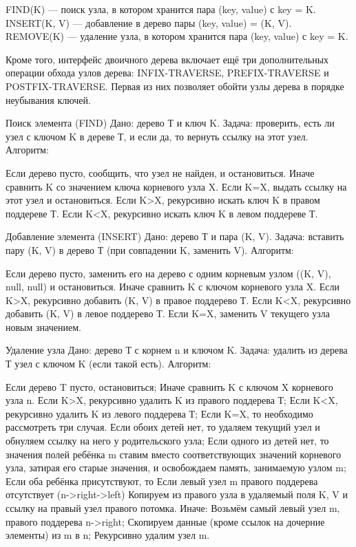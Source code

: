 \documentclass[a4paper, 12pt]{article}
\begin{document}
	FIND(K) — поиск узла, в котором хранится пара (key, value) с key = K.
	INSERT(K, V) — добавление в дерево пары (key, value) = (K, V).
	REMOVE(K) — удаление узла, в котором хранится пара (key, value) с key = K.


	Кроме того, интерфейс двоичного дерева включает ещё три дополнительных операции обхода узлов дерева: INFIX-TRAVERSE, PREFIX-TRAVERSE и POSTFIX-TRAVERSE. Первая из них позволяет обойти узлы дерева в порядке неубывания ключей.

	Поиск элемента (FIND)
	Дано: дерево Т и ключ K.
	Задача: проверить, есть ли узел с ключом K в дереве Т, и если да, то вернуть ссылку на этот узел.
	Алгоритм:

	Если дерево пусто, сообщить, что узел не найден, и остановиться.
	Иначе сравнить K со значением ключа корневого узла X.
	Если K=X, выдать ссылку на этот узел и остановиться.
	Если K>X, рекурсивно искать ключ K в правом поддереве Т.
	Если K<X, рекурсивно искать ключ K в левом поддереве Т.

	Добавление элемента (INSERT)
	Дано: дерево Т и пара (K, V).
	Задача: вставить пару (K, V) в дерево Т (при совпадении K, заменить V).
	Алгоритм:

	Если дерево пусто, заменить его на дерево с одним корневым узлом ((K, V), null, null) и остановиться.
	Иначе сравнить K с ключом корневого узла X.
	Если K>X, рекурсивно добавить (K, V) в правое поддерево Т.
	Если K<X, рекурсивно добавить (K, V) в левое поддерево Т.
	Если K=X, заменить V текущего узла новым значением.

	Удаление узла 
	Дано: дерево Т с корнем n и ключом K.
	Задача: удалить из дерева Т узел с ключом K (если такой есть).
	Алгоритм:

	Если дерево T пусто, остановиться;
	Иначе сравнить K с ключом X корневого узла n.
	Если K>X, рекурсивно удалить K из правого поддерева Т;
	Если K<X, рекурсивно удалить K из левого поддерева Т;
	Если K=X, то необходимо рассмотреть три случая.
	Если обоих детей нет, то удаляем текущий узел и обнуляем ссылку на него у родительского узла;
	Если одного из детей нет, то значения полей ребёнка m ставим вместо соответствующих значений корневого узла, затирая его старые значения, и освобождаем память, занимаемую узлом m;
	Если оба ребёнка присутствуют, то
	Если левый узел m правого поддерева отсутствует (n->right->left)
	Копируем из правого узла в удаляемый поля K, V и ссылку на правый узел правого потомка.
	Иначе:
	Возьмём самый левый узел m, правого поддерева n->right;
	Скопируем данные (кроме ссылок на дочерние элементы) из m в n;
	Рекурсивно удалим узел m.
\end{document}
